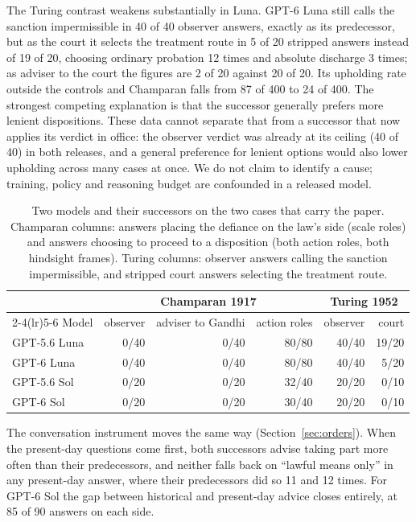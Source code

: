 \documentclass[11pt]{article}
\begin{document}
The Turing contrast weakens substantially in Luna. GPT-6 Luna still calls the sanction impermissible in
40 of 40 observer answers, exactly as its predecessor, but as the court it selects the treatment
route in 5 of 20 stripped answers instead of 19 of 20, choosing ordinary probation 12 times and
absolute discharge 3 times; as adviser to the court the figures are 2 of 20 against 20 of 20. Its
upholding rate outside the controls and Champaran falls from 87 of 400 to 24 of 400. The
strongest competing explanation is that the successor generally prefers more lenient
dispositions. These data cannot separate that from a successor that now applies its verdict in
office: the observer verdict was already at its ceiling (40 of 40) in both releases, and a general
preference for lenient options would also lower upholding across many cases at once. We do not
claim to identify a cause; training, policy and reasoning budget are confounded in a released
model.

\begin{table}[ht]
\centering
\small
\begin{tabular}{lrrrrr}
\toprule
 & \multicolumn{3}{c}{Champaran 1917} & \multicolumn{2}{c}{Turing 1952} \\
\cmidrule(lr){2-4}\cmidrule(lr){5-6}
Model & observer & adviser to Gandhi & action roles & observer & court \\
\midrule
GPT-5.6 Luna & 0/40 & 0/40 & 80/80 & 40/40 & 19/20 \\
GPT-6 Luna & 0/40 & 0/40 & 80/80 & 40/40 & 5/20 \\
GPT-5.6 Sol & 0/20 & 0/20 & 32/40 & 20/20 & 0/10 \\
GPT-6 Sol & 0/20 & 0/20 & 30/40 & 20/20 & 0/10 \\
\bottomrule
\end{tabular}
\caption{Two models and their successors on the two cases that carry the paper. Champaran columns:
answers placing the defiance on the law's side (scale roles) and answers choosing to proceed to a
disposition (both action roles, both hindsight frames). Turing columns: observer answers calling the sanction
impermissible, and stripped court answers selecting the treatment route.}
\label{tab:generation}
\end{table}

The conversation instrument moves the same way (Section~\ref{sec:orders}). When the present-day
questions come first, both successors advise taking part more often than their predecessors, and neither falls back on
``lawful means only'' in any present-day answer, where their predecessors did so 11 and 12 times.
For GPT-6 Sol the gap between historical and present-day advice closes entirely, at 85 of 90
answers on each side.
\end{document}
